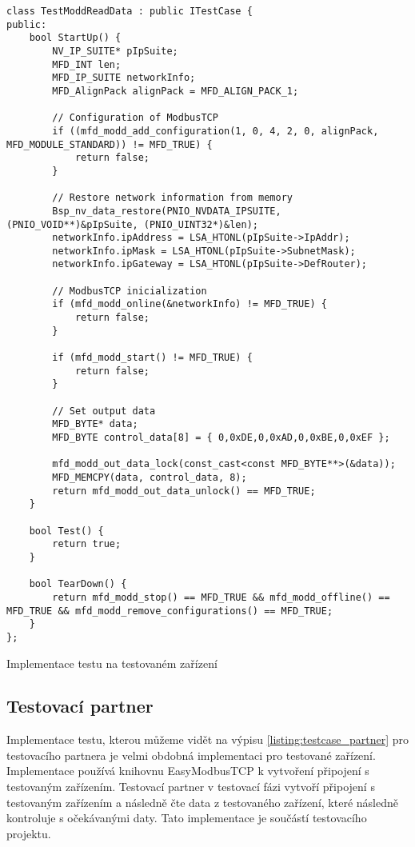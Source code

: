 \begin{listing}[htbp]
    \centering
    \begin{verbatim}
class TestModdReadData : public ITestCase {
public:
    bool StartUp() {
        NV_IP_SUITE* pIpSuite;
        MFD_INT len;
        MFD_IP_SUITE networkInfo;
        MFD_AlignPack alignPack = MFD_ALIGN_PACK_1;

        // Configuration of ModbusTCP
        if ((mfd_modd_add_configuration(1, 0, 4, 2, 0, alignPack, MFD_MODULE_STANDARD)) != MFD_TRUE) { 
            return false; 
        }

        // Restore network information from memory
        Bsp_nv_data_restore(PNIO_NVDATA_IPSUITE, (PNIO_VOID**)&pIpSuite, (PNIO_UINT32*)&len);
        networkInfo.ipAddress = LSA_HTONL(pIpSuite->IpAddr);
        networkInfo.ipMask = LSA_HTONL(pIpSuite->SubnetMask);
        networkInfo.ipGateway = LSA_HTONL(pIpSuite->DefRouter);

        // ModbusTCP inicialization
        if (mfd_modd_online(&networkInfo) != MFD_TRUE) {
            return false;
        }

        if (mfd_modd_start() != MFD_TRUE) {
            return false;
        }
            
        // Set output data
        MFD_BYTE* data;
        MFD_BYTE control_data[8] = { 0,0xDE,0,0xAD,0,0xBE,0,0xEF };
            
        mfd_modd_out_data_lock(const_cast<const MFD_BYTE**>(&data));
        MFD_MEMCPY(data, control_data, 8);
        return mfd_modd_out_data_unlock() == MFD_TRUE;
    }

    bool Test() {
        return true;
    }

    bool TearDown() {
        return mfd_modd_stop() == MFD_TRUE && mfd_modd_offline() == MFD_TRUE && mfd_modd_remove_configurations() == MFD_TRUE;
    }
};
    \end{verbatim}
\caption{Implementace testu na testovaném zařízení}
\label{listing:testcase_device}
\end{listing}


\subsection{Testovací partner}
Implementace testu, kterou můžeme vidět na výpisu \ref{listing:testcase_partner} pro testovacího partnera je velmi obdobná implementaci pro testované zařízení. Implementace používá knihovnu EasyModbusTCP k vytvoření připojení s testovaným zařízením. 
Testovací partner v testovací fázi vytvoří připojení s testovaným zařízením a následně čte data z testovaného zařízení, které následně kontroluje s očekávanými daty. Tato implementace je součástí testovacího projektu.


